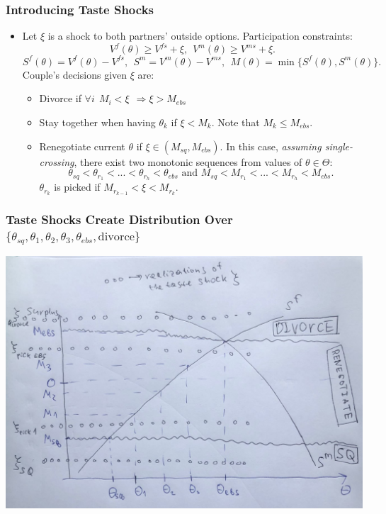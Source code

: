 \documentclass[aspectratio=169]{beamer}
\let\olditem\item
\renewcommand{\item}{%
\olditem\vspace{\fill}}
\begin{document}
\begin{frame}
\frametitle{Introducing Taste Shocks}
\begin{itemize}
\item Let $\xi$ is a shock to both partners' outside options. Participation constraints:
\[V^{f}(\theta) \geq V^{fs} + \xi, \ \ V^{m}(\theta) \geq V^{ms} + \xi.\]
\[S^f(\theta) = V^{f}(\theta) - V^{fs}, \ \ S^m = V^{m}(\theta) - V^{ms}, \ \ M(\theta) = \min\{S^f(\theta),S^m(\theta)\}.\]
Couple's decisions given $\xi$ are:
\begin{itemize}
\item Divorce if $\forall i \ \ M_i < \xi \ \ \Rightarrow \boxed{\xi > M_{ebs}}$
\item Stay together when having $\theta_k$ if $\boxed{\xi < M_k}$. Note that $M_k \leq M_{ebs}$.
\item Renegotiate current $\theta$ if $\xi \in (M_{sq}, M_{ebs})$. In this case, \textit{assuming single-crossing}, there exist two monotonic sequences from values of $\theta \in \Theta$:
\[ \theta_{sq} < \theta_{r_1} < ... < \theta_{r_h} < \theta_{ebs} \text{\ \ and \ \ } M_{sq} < M_{r_1} < ... < M_{r_h} < M_{ebs}.\]
$\theta_{r_k}$ is picked if $M_{r_{k-1}} < \xi < M_{r_k}$.
\end{itemize}
\end{itemize}
\end{frame}


\begin{frame}
\frametitle{Taste Shocks Create Distribution Over $\{\theta_{sq},\theta_1,\theta_2,\theta_3,\theta_{ebs},\text{divorce}\}$}
\begin{center}
\includegraphics[scale=0.25]{taste_shocks.jpg}
\end{center}
\end{frame}
\end{document}
